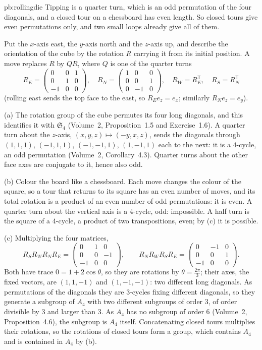 \begin{solution}{pb:rollingdie}
\idea Tipping is a quarter turn, which is an odd permutation of the four diagonals, and a closed tour on a chessboard has even length. So
closed tours give even permutations only, and two small loops already give all of them.

\writeup Put the $x$-axis east, the $y$-axis north and the $z$-axis up, and describe the orientation of the cube by the rotation $R$ carrying
it from its initial position. A move replaces $R$ by $QR$, where $Q$ is one of the quarter turns
\[
R_E=\begin{pmatrix}0&0&1\\0&1&0\\-1&0&0\end{pmatrix},\quad R_N=\begin{pmatrix}1&0&0\\0&0&1\\0&-1&0\end{pmatrix},\quad R_W=R_E^{\mathsf T},\quad R_S=R_N^{\mathsf T}
\]
(rolling east sends the top face to the east, so $R_Ee_z=e_x$; similarly $R_Ne_z=e_y$).

(a) The rotation group of the cube permutes its four long diagonals, and this identifies it with $\mathfrak S_4$ (Volume~2, Proposition~1.5 and Exercise~1.6). A
quarter turn about the $z$-axis, $(x,y,z)\mapsto(-y,x,z)$, sends the diagonals through $(1,1,1)$, $(-1,1,1)$, $(-1,-1,1)$, $(1,-1,1)$ each to the next: it is a
$4$-cycle, an odd permutation (Volume~2, Corollary~4.3). Quarter turns about the other face axes are conjugate to it, hence also odd.

(b) Colour the board like a chessboard. Each move changes the colour of the square, so a tour that returns to its square has an even
number of moves, and its total rotation is a product of an even number of odd permutations: it is even. A quarter turn about the vertical
axis is a $4$-cycle, odd: impossible. A half turn is the square of a $4$-cycle, a product of two transpositions, even; by (c) it is possible.

(c) Multiplying the four matrices,
\[
R_SR_WR_NR_E=\begin{pmatrix}0&1&0\\0&0&-1\\-1&0&0\end{pmatrix},\qquad R_NR_WR_SR_E=\begin{pmatrix}0&-1&0\\0&0&1\\-1&0&0\end{pmatrix}.
\]
Both have trace $0=1+2\cos\theta$, so they are rotations by $\theta=\frac{2\pi}3$; their axes, the fixed vectors, are $(1,1,-1)$ and $(1,-1,-1)$: two different long diagonals.
As permutations of the diagonals they are $3$-cycles fixing different diagonals, so they generate a subgroup of $A_4$ with two different
subgroups of order $3$, of order divisible by $3$ and larger than $3$. As $A_4$ has no subgroup of order $6$ (Volume~2, Proposition~4.6), the subgroup is $A_4$
itself. Concatenating closed tours multiplies their rotations, so the rotations of closed tours form a group, which contains $A_4$ and is
contained in $A_4$ by (b).


\end{solution}
